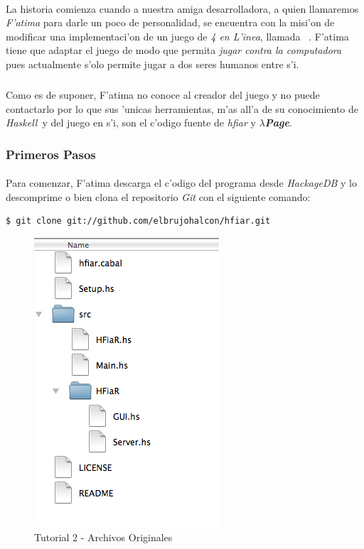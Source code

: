 \documentclass[a4paper]{article}
\newcommand{\haskell}{\textsl{Haskell}}
\newcommand{\hpage}{\textbf{\textsl{$\lambda$Page}}}
\begin{document}
\paragraph{}La historia comienza cuando a nuestra amiga desarrolladora, a quien llamaremos \textsl{F'atima} para darle un poco de personalidad, se encuentra con la misi'on de modificar una implementaci'on de un juego de \textsl{4 en L'inea}, llamada ~\cite{hfiar}.  F'atima tiene que adaptar el juego de modo que permita \textsl{jugar contra la computadora} pues actualmente s'olo permite jugar a dos seres humanos entre s'i.
\subparagraph{}Como es de suponer, F'atima no conoce al creador del juego y no puede contactarlo por lo que sus 'unicas herramientas, m'as all'a de su conocimiento de \haskell\ y del juego en s'i, son el c'odigo fuente de \textsl{hfiar} y \hpage.

\subsubsection{Primeros Pasos}
\paragraph{}Para comenzar, F'atima descarga el c'odigo del programa desde \textsl{HackageDB} y lo descomprime o bien clona el repositorio \textsl{Git} con el siguiente comando:
\lstset{language=sh, frame=single, tabsize=2}
\begin{lstlisting}
$ git clone git://github.com/elbrujohalcon/hfiar.git
\end{lstlisting}
\begin{figure}[hp]
	\begin{center}
        	\includegraphics{pictures/tut2/00}
		\caption{Tutorial 2 - Archivos Originales}
		\label{tut200}
	\end{center}
\end{figure}
\end{document}

